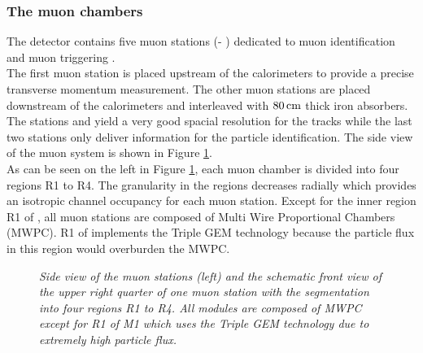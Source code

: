 \subsubsection{The muon chambers}
The \lhcb detector contains five muon stations (\Mone - \Mfive) dedicated to muon identification and muon triggering \cite{muon}.\\
The first muon station \Mone is placed upstream of the calorimeters to provide a precise transverse momentum measurement. The other muon stations are placed downstream of the calorimeters and interleaved with $80\rm \,cm$ thick iron absorbers. The stations \Mtwo and \Mthree yield a very good spacial resolution for the tracks while the last two stations only deliver information for the particle identification. The side view of the muon system is shown in Figure \ref{fig:muons}.\\
As can be seen on the left in Figure \ref{fig:muons}, each muon chamber is divided into four regions R1 to R4. The granularity in the regions decreases radially which provides an isotropic channel occupancy for each muon station. Except for the inner region R1 of \Mone, all muon stations are composed of Multi Wire Proportional Chambers (MWPC). R1 of \Mone implements the Triple GEM \cite{gem} technology because the particle flux in this region would overburden the MWPC.\\
\begin{figure}[ht]
\vspace*{-0.5cm}
  \begin{center}
  \vspace*{-1.0cm}
  \end{center}
  \caption{\textit{Side view of the muon stations (left) and the schematic front view of the upper right quarter of one muon station with the segmentation into four regions R1 to R4. All modules are composed of MWPC except for R1 of M1 which uses the Triple GEM technology due to extremely high particle flux.}\cite{muon}}
  \label{fig:muons}
\end{figure}

